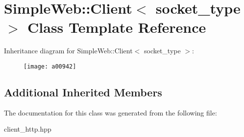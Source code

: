 \hypertarget{a00942}{}\section{Simple\+Web\+:\+:Client$<$ socket\+\_\+type $>$ Class Template Reference}
\label{a00942}
Inheritance diagram for Simple\+Web\+:\+:Client$<$ socket\+\_\+type $>$\+:\begin{figure}[H]
\begin{center}
\leavevmode
\texttt{[image: a00942]}
\end{center}
\end{figure}
\subsection*{Additional Inherited Members}


The documentation for this class was generated from the following file\+:\begin{DoxyCompactItemize}
\item 
client\+\_\+http.\+hpp\end{DoxyCompactItemize}
